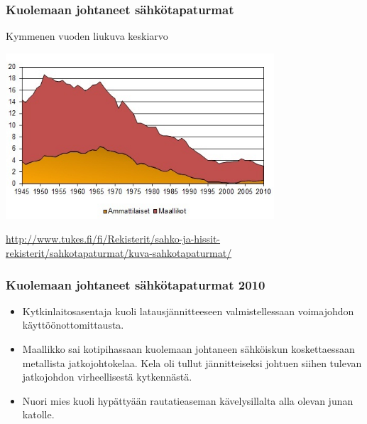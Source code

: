 \begin{frame}
\frametitle{Kuolemaan johtaneet sähkötapaturmat}
Kymmenen vuoden liukuva keskiarvo
\begin{center}
\includegraphics[width=10cm]{sahkoturvallisuus-perusteet_pics/Sahkokuolemat_2010.jpg}
\end{center}

\small \url{http://www.tukes.fi/fi/Rekisterit/sahko-ja-hissit-rekisterit/sahkotapaturmat/kuva-sahkotapaturmat/}
\end{frame}

\begin{frame}
\frametitle{Kuolemaan johtaneet sähkötapaturmat 2010}

\begin{itemize}
\item Kytkinlaitosasentaja kuoli latausjännitteeseen valmistellessaan voimajohdon käyttöönottomittausta.
\item Maallikko sai kotipihassaan kuolemaan johtaneen sähköiskun koskettaessaan metallista jatkojohtokelaa. Kela oli tullut jännitteiseksi johtuen siihen tulevan jatkojohdon virheellisestä kytkennästä. 
\item Nuori mies kuoli hypättyään rautatieaseman kävelysillalta alla olevan junan katolle.  
\end{itemize}
\end{frame}

